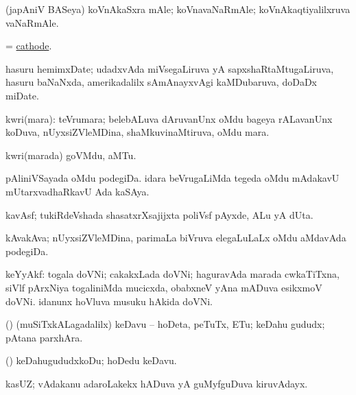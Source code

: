 \bentry
{}
\gl{\nA}
\bmng
(japAniV BASeya) koVnAkaSxra mAle; koVnavaNaRmAle; koVnAkaqtiyalilxruva vaNaRmAle. 
\emng
\eentry

\bentry
{}
\gl{\nA}
\bmng
= \hyperref{kandict_c.pdf}{C}{cathode}{cathode}. 
\emng
\eentry

\bentry
{}
\gl{\nA}
\bmng
hasuru hemimxDate; udadxvAda miVsegaLiruva yA sapxshaRtaMtugaLiruva, hasuru baNaNxda, amerikadalilx sAmAnayxvAgi kaMDubaruva, doDaDx miDate.   
\emng
\eentry

\bentry
{}
\gl{\nA}
\bmng
kwri(mara): teVrumara; belebALuva dAruvanUnx oMdu bageya rALavanUnx koDuva, nUyxsiZVleMDina, shaMkuvinaMtiruva, oMdu mara. 
\emng
\eentry

\bentry
{}
\gl{\nA}
\bmng
kwri(marada) goVMdu, aMTu. 
\emng
\eentry

\bentry
{}
\gl{\nA}
\bmng
\banum
{} pAliniVSayada oMdu podegiDa. 
 idara beVrugaLiMda tegeda oMdu mAdakavU mUtarxvadhaRkavU Ada kaSAya. 
\eanum
\emng
\eentry

\bentry
{}
\gl{\nA}
\bmng
kavAsf; tukiRdeVshada shasatxrXsajijxta poliVsf pAyxde, ALu yA dUta. 
\emng
\eentry

\bentry
{}
\gl{\nA}
\bmng
kAvakAva; nUyxsiZVleMDina, parimaLa biVruva elegaLuLaLx oMdu aMdavAda podegiDa. 
\emng
\eentry

\bentry
{}
\gl{\nA}
\bmng
keYyAkf: 
\banum
{} togala doVNi; cakakxLada doVNi; haguravAda marada cwkaTiTxna, siVlf pArxNiya togaliniMda mucicxda, obabxneV yAna mADuva esikxmoV doVNi. 
 idanunx hoVluva musuku hAkida doVNi. 
\eanum
\emng
\eentry

\bentry
{}
\gl{\nA}
\bmng
(\AmA) (muSiTxkALagadalilx) keDavu -- hoDeta, peTuTx, ETu; keDahu gududx; pAtana parxhAra. 
\emng
\eentry

\bentry
{}
\gl{\sakirx}
\bmng
(\AmA) keDahugududxkoDu; hoDedu keDavu. 
\emng
\eentry

\bentry
{}
\gl{\nA}
\bmng
kasUZ; vAdakanu adaroLakekx hADuva yA guMyfguDuva kiruvAdayx. 
\emng
\eentry

